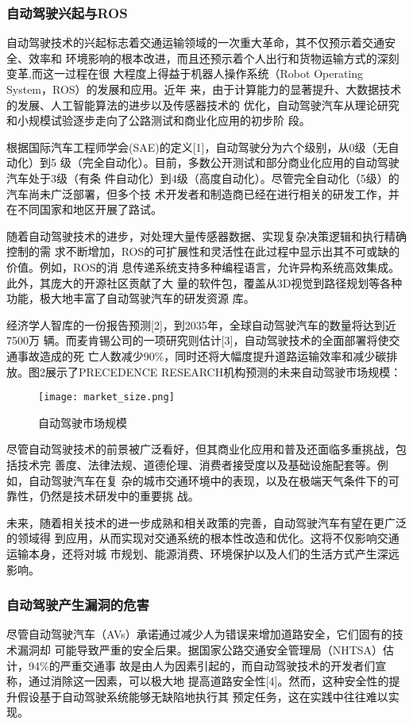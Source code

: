 \subsubsection{自动驾驶兴起与ROS}
自动驾驶技术的兴起标志着交通运输领域的一次重大革命，其不仅预示着交通安全、效率和
环境影响的根本改进，而且还预示着个人出行和货物运输方式的深刻变革,而这一过程在很
大程度上得益于机器人操作系统（Robot Operating System，ROS）的发展和应用。近年
来，由于计算能力的显著提升、大数据技术的发展、人工智能算法的进步以及传感器技术的
优化，自动驾驶汽车从理论研究和小规模试验逐步走向了公路测试和商业化应用的初步阶
段。

根据国际汽车工程师学会(SAE)的定义[1]，自动驾驶分为六个级别，从0级（无自动化）到5
级（完全自动化）。目前，多数公开测试和部分商业化应用的自动驾驶汽车处于3级（有条
件自动化）到4级（高度自动化）。尽管完全自动化（5级）的汽车尚未广泛部署，但多个技
术开发者和制造商已经在进行相关的研发工作，并在不同国家和地区开展了路试。

随着自动驾驶技术的进步，对处理大量传感器数据、实现复杂决策逻辑和执行精确控制的需
求不断增加，ROS的可扩展性和灵活性在此过程中显示出其不可或缺的价值。例如，ROS的消
息传递系统支持多种编程语言，允许异构系统高效集成。此外，其庞大的开源社区贡献了大
量的软件包，覆盖从3D视觉到路径规划等各种功能，极大地丰富了自动驾驶汽车的研发资源
库。

经济学人智库的一份报告预测[2]，到2035年，全球自动驾驶汽车的数量将达到近7500万
辆。而麦肯锡公司的一项研究则估计[3]，自动驾驶技术的全面部署将使交通事故造成的死
亡人数减少90\%，同时还将大幅度提升道路运输效率和减少碳排放。图2展示了PRECEDENCE
RESEARCH机构预测的未来自动驾驶市场规模：

\begin{figure}[H]
  \centering
  \texttt{[image: market\_size.png]}
  \caption{自动驾驶市场规模}
  \label{fig:my_label}
\end{figure}

尽管自动驾驶技术的前景被广泛看好，但其商业化应用和普及还面临多重挑战，包括技术完
善度、法律法规、道德伦理、消费者接受度以及基础设施配套等。例如，自动驾驶汽车在复
杂的城市交通环境中的表现，以及在极端天气条件下的可靠性，仍然是技术研发中的重要挑
战。

未来，随着相关技术的进一步成熟和相关政策的完善，自动驾驶汽车有望在更广泛的领域得
到应用，从而实现对交通系统的根本性改造和优化。这将不仅影响交通运输本身，还将对城
市规划、能源消费、环境保护以及人们的生活方式产生深远影响。

\subsubsection{自动驾驶产生漏洞的危害}
尽管自动驾驶汽车（AVs）承诺通过减少人为错误来增加道路安全，它们固有的技术漏洞却
可能导致严重的安全后果。据国家公路交通安全管理局（NHTSA）估计，94\%的严重交通事
故是由人为因素引起的，而自动驾驶技术的开发者们宣称，通过消除这一因素，可以极大地
提高道路安全性[4]。然而，这种安全性的提升假设基于自动驾驶系统能够无缺陷地执行其
预定任务，这在实践中往往难以实现。

